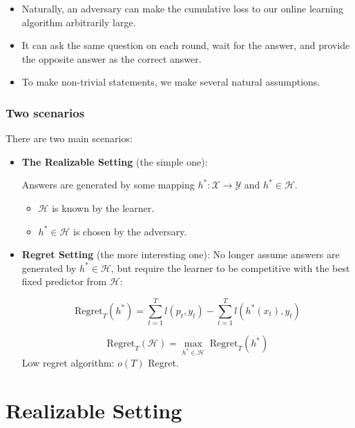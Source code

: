 \documentclass{beamer}
\newcommand{\Hyp}{\mathcal{H}}
\newcommand{\Yspace}{\mathcal{Y}}
\newcommand{\Xspace}{\mathcal{X}}
\begin{document}
\begin{frame}
\begin{itemize}
\item Naturally, an adversary can make the cumulative loss to our online learning algorithm arbitrarily large.
\pause
\item It can ask the same question on each round, wait for the answer, and provide the opposite answer as the correct answer.
\pause
\item To make non-trivial statements, we make several natural assumptions.

\end{itemize}
\end{frame}

\begin{frame}
\frametitle{Two scenarios}
There are two main scenarios:

\begin{itemize}
\item \textbf{The Realizable Setting} (the simple one):

Answers are generated by some mapping $h^*: \Xspace \to \Yspace$ and $h^* \in \Hyp$.\\


\begin{itemize}
\item $\mathcal{H}$ is known by the learner.
\item $h^* \in \mathcal{H}$ is chosen by the adversary.
\end{itemize}
\pause

\item \textbf{Regret Setting} (the more interesting one): No longer assume answers are generated by $h^* \in \Hyp$, but require the learner to be competitive with the best fixed predictor from $\Hyp$:

\begin{equation}
\mathrm{Regret}_T(h^*) = \sum_{t = 1}^{T} l(p_t, y_t) - \sum_{t = 1}^{T} l(h^*(x_t), y_t)
\end{equation}

\begin{equation}
\mathrm{Regret}_T(\Hyp) = \max_{h^* \in \Hyp}  \; \mathrm{Regret}_T(h^*)
\end{equation}
Low regret algorithm: $o(T)$ Regret.

\end{itemize}
\end{frame}

\section{Realizable Setting}
\frame{\sectionpage}
\end{document}
